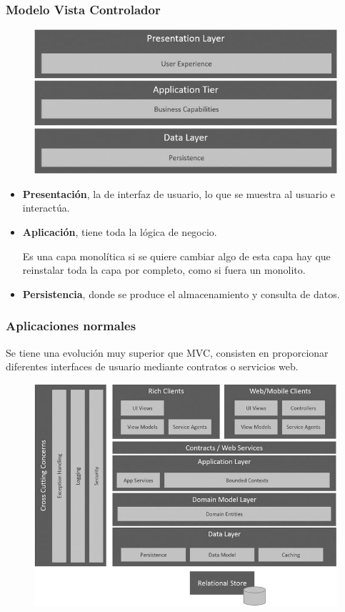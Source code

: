 \documentclass[12pt]{report} %
\begin{document}
\subsubsection{Modelo Vista Controlador}
\begin{figure}[H]
	{\includegraphics[scale=.8]{9781484212769_Fig03-01.jpg}}
\end{figure}
\begin{itemize}
	\item \textbf{Presentación}, la de interfaz de usuario, lo que se muestra al usuario e interactúa.
	\item \textbf{Aplicación}, tiene toda la lógica de negocio.
	
	Es una capa monolítica si se quiere cambiar algo de esta capa hay que reinstalar toda la capa por completo, como si fuera un monolito.
	
	\item \textbf{Persistencia}, donde se produce el almacenamiento y consulta de datos.
\end{itemize}
\pagebreak
\subsubsection{Aplicaciones normales}

Se tiene una evolución muy superior que MVC, consisten en proporcionar diferentes interfaces de usuario mediante contratos o servicios web.

\begin{figure}[H]
	{\includegraphics[scale=.8]{9781484212769_Fig03-02.jpg}}
\end{figure}
\end{document}
